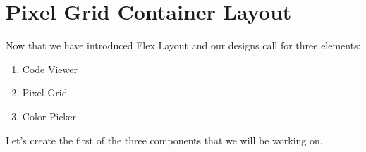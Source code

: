 \maketitle{}
\section{ Pixel Grid Container Layout }

Now that we have introduced Flex Layout and our designs call for three elements:
\begin{enumerate}
  \item Code Viewer
  \item Pixel Grid
  \item Color Picker
\end{enumerate}

Let's create the first of the three components that we will be working on.

